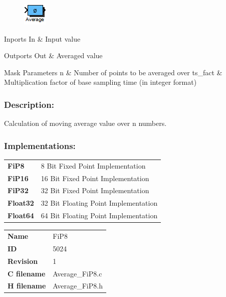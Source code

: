 \label{block:Average}
\begin{figure}[H]\includegraphics{Average}\end{figure} 

\begin{XtoCtabular}{Inports}
In & Input value\tabularnewline
\hline
\end{XtoCtabular}


\begin{XtoCtabular}{Outports}
Out & Averaged value\tabularnewline
\hline
\end{XtoCtabular}

\begin{XtoCtabular}{Mask Parameters}
n & Number of points to be averaged over\tabularnewline
\hline
ts\_fact & Multiplication factor of base sampling time (in integer format)\tabularnewline
\hline
\end{XtoCtabular}

\subsubsection*{Description:}
Calculation of moving average value over n numbers.


\subsubsection*{Implementations:}
\begin{tabular}{l l}
\textbf{FiP8} & 8 Bit Fixed Point Implementation\tabularnewline
\textbf{FiP16} & 16 Bit Fixed Point Implementation\tabularnewline
\textbf{FiP32} & 32 Bit Fixed Point Implementation\tabularnewline
\textbf{Float32} & 32 Bit Floating Point Implementation\tabularnewline
\textbf{Float64} & 64 Bit Floating Point Implementation\tabularnewline
\end{tabular}

\nopagebreak[0]
\begin{tabular}{l l}
\textbf{Name} & FiP8 \tabularnewline
\textbf{ID} & 5024 \tabularnewline
\textbf{Revision} & 1 \tabularnewline
\textbf{C filename} & Average\_FiP8.c \tabularnewline
\textbf{H filename} & Average\_FiP8.h \tabularnewline
\end{tabular}
\vspace{1ex}

